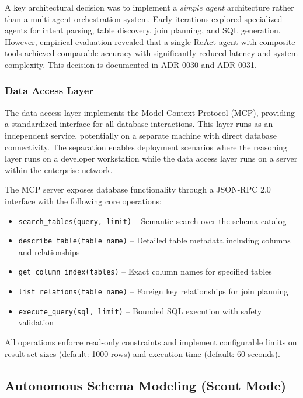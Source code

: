 A key architectural decision was to implement a \emph{simple agent} architecture rather than a multi-agent orchestration system. Early iterations explored specialized agents for intent parsing, table discovery, join planning, and SQL generation. However, empirical evaluation revealed that a single ReAct agent with composite tools achieved comparable accuracy with significantly reduced latency and system complexity. This decision is documented in ADR-0030 and ADR-0031.

\subsubsection{Data Access Layer}

The data access layer implements the Model Context Protocol (MCP), providing a standardized interface for all database interactions. This layer runs as an independent service, potentially on a separate machine with direct database connectivity. The separation enables deployment scenarios where the reasoning layer runs on a developer workstation while the data access layer runs on a server within the enterprise network.

The MCP server exposes database functionality through a JSON-RPC 2.0 interface with the following core operations:

\begin{itemize}
    \item \texttt{search\_tables(query, limit)} -- Semantic search over the schema catalog
    \item \texttt{describe\_table(table\_name)} -- Detailed table metadata including columns and relationships
    \item \texttt{get\_column\_index(tables)} -- Exact column names for specified tables
    \item \texttt{list\_relations(table\_name)} -- Foreign key relationships for join planning
    \item \texttt{execute\_query(sql, limit)} -- Bounded SQL execution with safety validation
\end{itemize}

All operations enforce read-only constraints and implement configurable limits on result set sizes (default: 1000 rows) and execution time (default: 60 seconds).

\subsection{Autonomous Schema Modeling (Scout Mode)}
\label{subsec:scout-mode}

